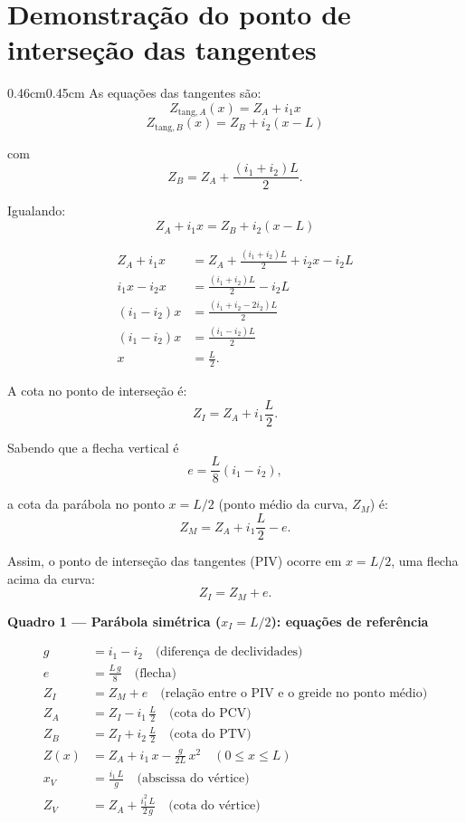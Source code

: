\documentclass[12pt,letterpaper]{article}
\newenvironment{corpo}{\begin{adjustwidth}{0.46cm}{0.45cm}\justifying}{\end{adjustwidth}}
\begin{document}
\section*{Demonstração do ponto de interseção das tangentes}

\begin{corpo}
As equações das tangentes são:
\[
 Z_{\mathrm{tang},A}(x)=Z_A+i_1x
\]
\[
 Z_{\mathrm{tang},B}(x)=Z_B+i_2(x-L)
\]

com
\[
 Z_B=Z_A+\frac{(i_1+i_2)L}{2}.
\]

Igualando:
\[
 Z_A+i_1x=Z_B+i_2(x-L)
\]

\[
\begin{aligned}
Z_A+i_1x
&=Z_A+\frac{(i_1+i_2)L}{2}+i_2x-i_2L \\
i_1x-i_2x
&=\frac{(i_1+i_2)L}{2}-i_2L \\
(i_1-i_2)x
&=\frac{(i_1+i_2-2i_2)L}{2} \\
(i_1-i_2)x
&=\frac{(i_1-i_2)L}{2} \\
x&=\frac{L}{2}.
\end{aligned}
\]

A cota no ponto de interseção é:
\[
 Z_I=Z_A+i_1\frac{L}{2}.
\]

Sabendo que a flecha vertical é
\[
 e=\frac{L}{8}(i_1-i_2),
\]

a cota da parábola no ponto $x=L/2$ (ponto médio da curva, $Z_M$) é:
\[
 Z_M=Z_A+i_1\frac{L}{2}-e.
\]

Assim, o ponto de interseção das tangentes (PIV) ocorre em $x=L/2$, uma flecha acima da curva:
\[
 Z_I=Z_M+e.
\]
\end{corpo}

\begin{mdframed}[style=quadrostyle,nobreak=true]
\begin{center}
  {\small\bfseries Quadro 1 --- Parábola simétrica ($x_I = L/2$): equações de referência}
\end{center}
\begin{align*}
  g   &= i_1 - i_2 \quad\text{(diferença de declividades)}\\
  e   &= \tfrac{L\,g}{8} \quad\text{(flecha)}\\
  Z_I &= Z_M + e \quad\text{(relação entre o PIV e o greide no ponto médio)}\\
  Z_A &= Z_I - i_1\,\tfrac{L}{2} \quad\text{(cota do PCV)}\\
  Z_B &= Z_I + i_2\,\tfrac{L}{2} \quad\text{(cota do PTV)}\\
  Z(x)&= Z_A + i_1\,x - \tfrac{g}{2L}\,x^2 \quad\text{$(0 \le x \le L)$}\\
  x_V &= \tfrac{i_1\,L}{g} \quad\text{(abscissa do vértice)}\\
  Z_V &= Z_A + \tfrac{i_1^2\,L}{2\,g} \quad\text{(cota do vértice)}
\end{align*}
\end{mdframed}
\end{document}
